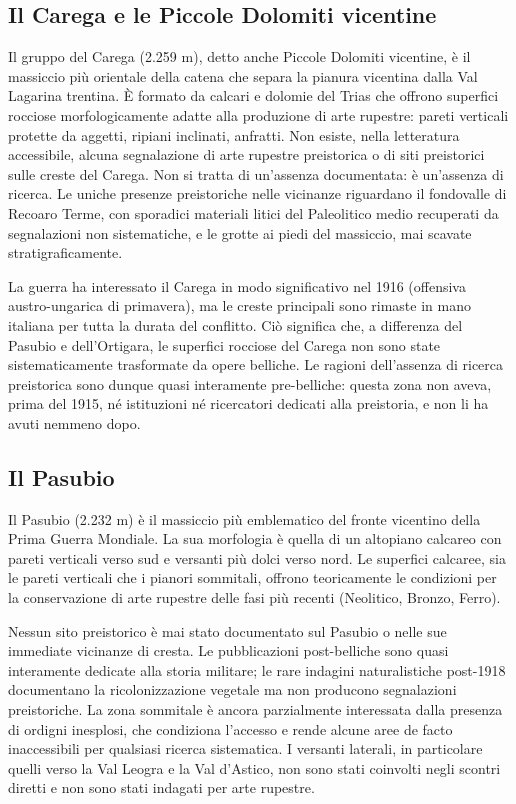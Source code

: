 \subsection{Il Carega e le Piccole Dolomiti vicentine}

Il gruppo del Carega (2.259 m), detto anche Piccole Dolomiti vicentine, è il massiccio più orientale della catena che separa la pianura vicentina dalla Val Lagarina trentina. È formato da calcari e dolomie del Trias che offrono superfici rocciose morfologicamente adatte alla produzione di arte rupestre: pareti verticali protette da aggetti, ripiani inclinati, anfratti. Non esiste, nella letteratura accessibile, alcuna segnalazione di arte rupestre preistorica o di siti preistorici sulle creste del Carega. Non si tratta di un'assenza documentata: è un'assenza di ricerca. Le uniche presenze preistoriche nelle vicinanze riguardano il fondovalle di Recoaro Terme, con sporadici materiali litici del Paleolitico medio recuperati da segnalazioni non sistematiche, e le grotte ai piedi del massiccio, mai scavate stratigraficamente.

La guerra ha interessato il Carega in modo significativo nel 1916 (offensiva austro-ungarica di primavera), ma le creste principali sono rimaste in mano italiana per tutta la durata del conflitto. Ciò significa che, a differenza del Pasubio e dell'Ortigara, le superfici rocciose del Carega non sono state sistematicamente trasformate da opere belliche. Le ragioni dell'assenza di ricerca preistorica sono dunque quasi interamente pre-belliche: questa zona non aveva, prima del 1915, né istituzioni né ricercatori dedicati alla preistoria, e non li ha avuti nemmeno dopo.

\subsection{Il Pasubio}

Il Pasubio (2.232 m) è il massiccio più emblematico del fronte vicentino della Prima Guerra Mondiale. La sua morfologia è quella di un altopiano calcareo con pareti verticali verso sud e versanti più dolci verso nord. Le superfici calcaree, sia le pareti verticali che i pianori sommitali, offrono teoricamente le condizioni per la conservazione di arte rupestre delle fasi più recenti (Neolitico, Bronzo, Ferro).

Nessun sito preistorico è mai stato documentato sul Pasubio o nelle sue immediate vicinanze di cresta. Le pubblicazioni post-belliche sono quasi interamente dedicate alla storia militare; le rare indagini naturalistiche post-1918 documentano la ricolonizzazione vegetale ma non producono segnalazioni preistoriche. La zona sommitale è ancora parzialmente interessata dalla presenza di ordigni inesplosi, che condiziona l'accesso e rende alcune aree de facto inaccessibili per qualsiasi ricerca sistematica. I versanti laterali, in particolare quelli verso la Val Leogra e la Val d'Astico, non sono stati coinvolti negli scontri diretti e non sono stati indagati per arte rupestre.

